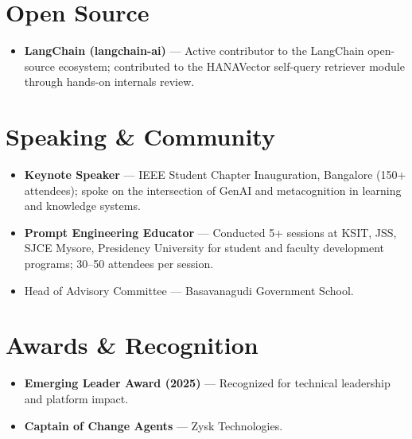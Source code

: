 \documentclass[letterpaper,11pt]{article}
\newcommand{\resumeItem}[1]{
  \item\small{
    {#1 \vspace{-2pt}}
  }
}
\newcommand{\resumeSubItem}[1]{\resumeItem{#1}\vspace{-4pt}}
\newcommand{\resumeSubHeadingListStart}{\begin{itemize}[leftmargin=0.15in, label={}]}
\newcommand{\resumeSubHeadingListEnd}{\end{itemize}}
\begin{document}
\section{Open Source}
  \resumeSubHeadingListStart
    \resumeSubItem{\textbf{LangChain (langchain-ai)} --- Active contributor to the LangChain open-source ecosystem; contributed to the HANAVector self-query retriever module through hands-on internals review.}
  \resumeSubHeadingListEnd

\section{Speaking \& Community}
  \resumeSubHeadingListStart
    \resumeSubItem{\textbf{Keynote Speaker} --- IEEE Student Chapter Inauguration, Bangalore (150+ attendees); spoke on the intersection of GenAI and metacognition in learning and knowledge systems.}
    \resumeSubItem{\textbf{Prompt Engineering Educator} --- Conducted 5+ sessions at KSIT, JSS, SJCE Mysore, Presidency University for student and faculty development programs; 30--50 attendees per session.}
    \resumeSubItem{Head of Advisory Committee --- Basavanagudi Government School.}
  \resumeSubHeadingListEnd

\section{Awards \& Recognition}
  \resumeSubHeadingListStart
    \resumeSubItem{\textbf{Emerging Leader Award (2025)} --- Recognized for technical leadership and platform impact.}
    \resumeSubItem{\textbf{Captain of Change Agents} --- Zysk Technologies.}
  \resumeSubHeadingListEnd
\end{document}
